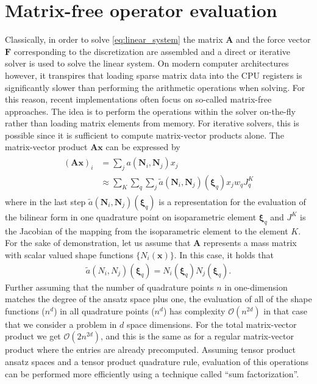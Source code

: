 \documentclass[preprint,12pt,times]{elsarticle}
\def\gz  #1{           \mbox{$\boldsymbol{#1}$}}
\begin{document}
\section{Matrix-free operator evaluation}
\label{sec:mf}
Classically, in order to solve \eqref{eq:linear_system} the matrix $\gz A$ and the force vector $\gz F$ corresponding to the discretization are assembled and
a direct or iterative solver is used to solve the linear system.
On modern computer architectures however, it transpires that loading sparse matrix data into the CPU registers is significantly slower than performing the arithmetic operations when solving.
For this reason, recent implementations often focus on so-called matrix-free approaches. The idea is to perform the operations within the solver on-the-fly
rather than loading matrix elements from memory.
For iterative solvers, this is possible since it is sufficient to compute matrix-vector products alone.
%
The matrix-vector product $\gz A \gz x$ can be expressed by
\begin{align}
  \begin{split}
 (\gz A \gz x)_i &= \sum_j a(\gz N_i,\gz N_j) x_j \\
        &\approx \sum_K \sum_q \sum_j \tilde{a}(\gz N_i,\gz N_j)(\gz \xi_q) x_j w_q J^K_q
  \end{split}
  \label{eq:mf_vmult}
\end{align}
where in the last step $\tilde{a}(\gz N_i,\gz N_j)(\gz \xi_q)$ is a representation for the evaluation of the bilinear form in one quadrature point on isoparametric element $\gz \xi_q$ and $J^K$ is the Jacobian of the mapping from the isoparametric element to the element $K$.
For the sake of demonstration, let us assume that $\gz A$ represents a mass matrix with scalar valued shape functions $\{ N_i(\gz x) \}$. In this case, it holds that
\begin{align*}
 \tilde{a}(N_i,N_j)(\gz \xi_q) = N_i(\gz \xi_q)N_j(\gz \xi_q).
\end{align*}
Further assuming that the number of quadrature points $n$ in one-dimension matches the degree of the ansatz space plus one, the evaluation of all of the shape functions ($n^d$)
in all quadrature points ($n^d$) has complexity $\mathcal{O}(n^{2d})$ in that case that we consider a problem in $d$ space dimensions. For the total matrix-vector product we get $\mathcal{O}(2n^{2d})$,
and this is the same as for a regular matrix-vector product where the entries are already precomputed. Assuming tensor product ansatz spaces and a tensor product quadrature rule, evaluation of this operations can be performed more efficiently using a technique called ``sum factorization''.
\end{document}
